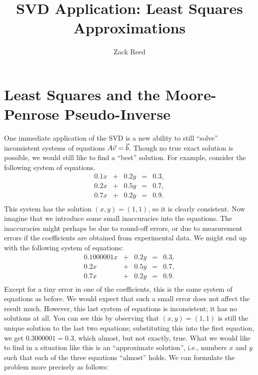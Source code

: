 \documentclass{ximera}
\author{Zack Reed}
\title{SVD Application: Least Squares Approximations}
\begin{document}
\begin{abstract}

\end{abstract}
\maketitle


\section*{Least Squares and the Moore-Penrose Pseudo-Inverse}
\label{sec:least-squares}


One immediate application of the SVD is a new ability to still ``solve'' inconsistent systems of equations $A\vec{v}=\vec{b}$. Though no true exact solution is possible, we would still like
to find a ``best'' solution. For example, consider the following system
of equations.
\begin{equation*}
  \begin{array}{rcrcl}
    0.1 x &+& 0.2 y &=& 0.3, \\
    0.2 x &+& 0.5 y &=& 0.7, \\
    0.7 x &+& 0.2 y &=& 0.9. \\
  \end{array}
\end{equation*}
This system has the solution $(x,y)=(1,1)$, so it is clearly
consistent. Now imagine that we introduce some small inaccuracies into
the equations. The inaccuracies might perhaps be due to round-off
errors, or due to measurement errors if the coefficients are obtained
from experimental data. We might end up with the following system of
equations:
\begin{equation*}
  \begin{array}{rcrcl}
    0.1000001 x &+& 0.2 y &=& 0.3, \\
    0.2 x &+& 0.5 y &=& 0.7, \\
    0.7 x &+& 0.2 y &=& 0.9. \\
  \end{array}
\end{equation*}
Except for a tiny error in one of the coefficients, this is the same
system of equations as before. We would expect that such a small error
does not affect the result much. However, this last system of
equations is inconsistent; it has no solutions at all. You can see
this by observing that $(x,y)=(1,1)$ is still the unique solution to
the last two equations; substituting this into the first equation, we
get $0.3000001 = 0.3$, which almost, but not exactly, true. What we
would like to find in a situation like this is an ``approximate
solution'', i.e., numbers $x$ and $y$ such that each of the three
equations ``almost'' holds. We can formulate the problem more
precisely as follows:
\end{document}
